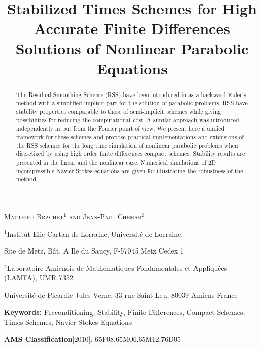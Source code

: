 \title{Stabilized Times Schemes for  High Accurate Finite Differences Solutions of Nonlinear Parabolic Equations}
\maketitle
\centerline{\scshape Matthieu Brachet$^{1}$ and Jean-Paul Chehab$^2$ 
}
\medskip
\centerline{$^{1}${\footnotesize Institut Elie Cartan de Lorraine, Universit\'e de Lorraine,  }} 
 \centerline{{\footnotesize Site de Metz, B\^at. A Ile du Saucy, F-57045 Metz Cedex 1 }}
{%
\centerline{$^{2}${\footnotesize Laboratoire Amienois de Math\'ematiques Fondamentales et Appliqu\'ees (LAMFA), {\small UMR} 7352}}
  \centerline{{\footnotesize Universit\'e de Picardie Jules Verne, 33 rue Saint Leu, 80039 Amiens France} }
  

\begin{abstract}
The Residual Smoothing Scheme (RSS) have been introduced in \cite{AverbuchCohenIsraeli} as a backward Euler's method with a simplified implicit part for the solution of parabolic problems. RSS have stability properties comparable to those of  semi-implicit schemes while giving possibilities for reducing  the computational cost. A similar approach was introduced independently in \cite{BCostaPHD,CDGT} but from the Fourier point of view. We present here
a unified  framework for these schemes and propose practical  implementations and extensions of the RSS schemes for the long time simulation of nonlinear parabolic problems when discretized by using high order finite differences compact schemes. Stability results are presented in the linear and the nonlinear case. Numerical simulations of 2D incompressible Navier-Stokes equations are given for illustrating the robustness of the method.
\end{abstract}

{\small 

{\bf Keywords:} {Preconditioning, Stability, Finite Differences, Compact Schemes, Times Schemes, Navier-Stokes Equations}

\hskip 0.2in{\bf  AMS Classification}[2010]: {65F08,65M06,65M12,76D05}}


}
